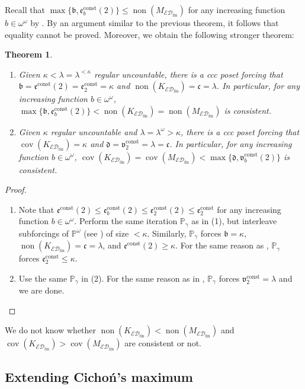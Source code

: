 \documentclass[a4paper,12pt]{amsart}
\newtheorem{thm}{Theorem}
\theoremstyle{definition}
\numberwithin{thm}{section}
\numberwithin{equation}{section}
\newcommand{\p}{\mathbb{P}}
\newcommand{\oo}{{\omega}^\omega}
\newcommand{\bb}{\mathfrak{b}}
\newcommand{\cc}{\mathfrak{c}}
\newcommand{\dd}{\mathfrak{d}}
\newcommand{\ee}{\mathfrak{e}}
\DeclareMathOperator{\non}{non}
\DeclareMathOperator{\cov}{cov}
\newcommand{\edfin}{\mathcal{ED}_\mathrm{fin}}
\newcommand{\continuum}{\mathfrak{c}}
\newcommand{\eec}{\ee^{\mathrm{const}}}
\newcommand{\vv}{\mathfrak{v}}
\newcommand{\vvc}{\vv^{\mathrm{const}}}
\begin{document}
    Recall that $\max\{\bb,\eec_b(2)\}\leq\non(M_{\edfin})$ for any increasing function $b\in\oo$ by .
    By an argument similar to the previous theorem, it follows that equality cannot be proved. Moreover, we obtain the following stronger theorem: 
    
    \begin{thm}
    \label{thm:Con_max_nonKEDfin}
        \begin{enumerate}
            \item Given $\kappa<\lambda=\lambda^{<\kappa}$ regular uncountable, there is a ccc poset forcing that $\bb=\eec(2)=\eec_2=\kappa$ and $\non(K_{\edfin})=\cc=\lambda$.
            In particular, for any increasing function $b\in\oo$,  $\max\{\bb,\eec_b(2)\}<\non(K_{\edfin}) = \non(M_{\edfin})$ is consistent.
            \item Given $\kappa$ regular uncountable and $\lambda=\lambda^{\omega}>\kappa$, there is a ccc poset forcing  that $\cov(K_{\edfin})=\kappa$ and $\dd=\vvc_2=\lambda=\continuum$.
            In particular, for any increasing function $b\in\oo$,  $\cov(K_{\edfin}) = \cov(M_{\edfin}) <\max\{\dd,\vvc_b(2)\}$ is consistent.
        \end{enumerate}
    \end{thm}
    \begin{proof}
        \begin{enumerate}
            \item Note that $\eec(2)\leq\eec_b(2)\leq\eec_2(2)\leq\eec_2$ for any increasing function $b\in\oo$. Perform the same iteration $\p_\gamma$ as in  (1), but interleave subforcings of $\p^\omega$ (see ) of size $<\kappa$.
            Similarly, $\p_\gamma$ forces $\bb=\kappa$,  $\non(K_{\edfin})=\cc=\lambda$, and $\eec(2)\geq\kappa$. For the same reason as , $\p_\gamma$ forces $\eec_2\leq\kappa$.
            \item Use the same $\p_\gamma$ in  (2). For the same reason as in , $\p_\gamma$ forces $\vvc_2=\lambda$ and we are done.
        \end{enumerate}
    \end{proof}
    
    We do not know whether $\non(K_{\edfin})<\non(M_{\edfin})$ and $\cov(K_{\edfin})>\cov(M_{\edfin})$ are consistent or not.


    \subsection{Extending Cicho\'n's maximum}\label{sec:CM}
    
\end{document}

